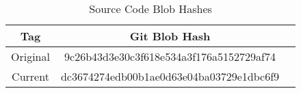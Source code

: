 \begin{longtable}{|c|c|c|}
    \caption{Source Code Blob Hashes}
    \label{tab:sourceCodeBlobHashes}

    \\ \hline

    \rowcolor{McMasterMediumGrey}
    \textbf{Tag} & \textbf{Git Blob Hash}                   
    \\ \hline

    Original     & 9c26b43d3e30c3f618e534a3f176a5152729af74 
    \\ \hline

    Current      & dc3674274edb00b1ae0d63e04ba03729e1dbc6f9 
    \\ \hline
\end{longtable}
